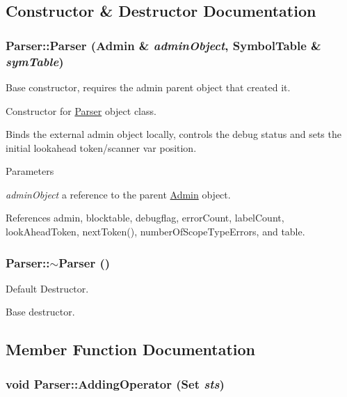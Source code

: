 \subsection{Constructor \& Destructor Documentation}
\hypertarget{classParser_adb5ff4e366a04633abe9d33e951196b2}{
\subsubsection[{Parser}]{\setlength{\rightskip}{0pt plus 5cm}Parser::Parser ({\bf Admin} \& {\em adminObject}, \/  {\bf SymbolTable} \& {\em symTable})}}
\label{classParser_adb5ff4e366a04633abe9d33e951196b2}


Base constructor, requires the admin parent object that created it. 

Constructor for \hyperlink{classParser}{Parser} object class.

Binds the external admin object locally, controls the debug status and sets the initial lookahead token/scanner var position.


\begin{DoxyParams}{Parameters}
\item[{\em adminObject}]a reference to the parent \hyperlink{classAdmin}{Admin} object. \end{DoxyParams}


References admin, blocktable, debugflag, errorCount, labelCount, lookAheadToken, nextToken(), numberOfScopeTypeErrors, and table.

\hypertarget{classParser_a3e658b5917a93a3ef648050d060e3a93}{
\subsubsection[{$\sim$Parser}]{\setlength{\rightskip}{0pt plus 5cm}Parser::$\sim$Parser ()}}
\label{classParser_a3e658b5917a93a3ef648050d060e3a93}


Default Destructor. 

Base destructor.

\subsection{Member Function Documentation}
\hypertarget{classParser_a909c968479dd3bafe797f2409e197179}{
\subsubsection[{AddingOperator}]{\setlength{\rightskip}{0pt plus 5cm}void Parser::AddingOperator ({\bf Set} {\em sts})}}
\label{classParser_a909c968479dd3bafe797f2409e197179}


